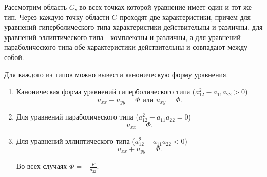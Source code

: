 Рассмотрим область $G$, во всех точках которой уравнение имеет один и тот же тип. Через каждую точку области $G$ проходят две характеристики, причем для уравнений гиперболического типа характеристики действительны и различны, для уравнений эллиптического типа - комплексны и различны, а для уравнений параболического типа обе характеристики действительны и совпадают между собой. 

Для каждого из типов можно вывести каноническую форму уравнения.
\begin{enumerate}
	\item Каноническая форма уравнений гиперболического типа ($a_{12}^2 - a_{11} a_{22} > 0$) \begin{equation}
		u_{xx} - u_{yy} = \Phi \text{ или } u_{xy} = \Phi.
	\end{equation}
	
	\item Для уравнений параболического типа ($a_{12}^2 - a_{11} a_{22} = 0$)
	\begin{equation}
		u_{xx} = \Phi.
	\end{equation}
	
	\item Для уравнений эллиптического типа ($a_{12}^2 - a_{11} a_{22} < 0$)
	\begin{equation}
		u_{xx} + u_{yy} = \Phi.
	\end{equation} 
	
	Во всех случаях $\Phi = -\frac{\bar{F}}{\bar{a}_{22}}$.
\end{enumerate}